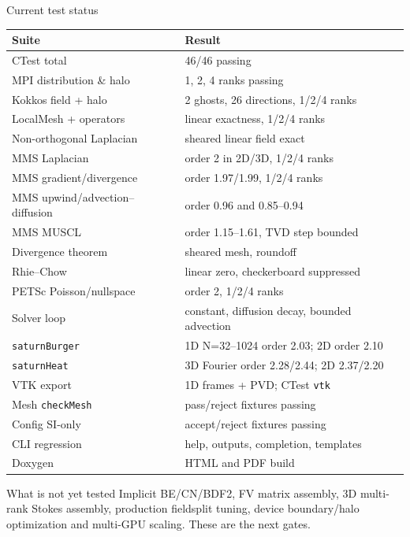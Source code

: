 \documentclass[aspectratio=169,10pt]{beamer}
\begin{document}
\begin{frame}{Current test status}
  \begin{center}
    \small
    \begin{tabular}{ll}
      \toprule
      Suite & Result \\
      \midrule
      CTest total & 46/46 passing \\
      MPI distribution \& halo & 1, 2, 4 ranks passing \\
      Kokkos field + halo & 2 ghosts, 26 directions, 1/2/4 ranks \\
      LocalMesh + operators & linear exactness, 1/2/4 ranks \\
      Non-orthogonal Laplacian & sheared linear field exact \\
      MMS Laplacian & order 2 in 2D/3D, 1/2/4 ranks \\
      MMS gradient/divergence & order 1.97/1.99, 1/2/4 ranks \\
      MMS upwind/advection--diffusion & order 0.96 and 0.85--0.94 \\
      MMS MUSCL & order 1.15--1.61, TVD step bounded \\
      Divergence theorem & sheared mesh, roundoff \\
      Rhie--Chow & linear zero, checkerboard suppressed \\
      PETSc Poisson/nullspace & order 2, 1/2/4 ranks \\
      Solver loop & constant, diffusion decay, bounded advection \\
      \texttt{saturnBurger} & 1D N=32--1024 order 2.03; 2D order 2.10 \\
      \texttt{saturnHeat} & 3D Fourier order 2.28/2.44; 2D 2.37/2.20 \\
      VTK export & 1D frames + PVD; CTest \texttt{vtk} \\
      Mesh \texttt{checkMesh} & pass/reject fixtures passing \\
      Config SI-only & accept/reject fixtures passing \\
      CLI regression & help, outputs, completion, templates \\
      Doxygen & HTML and PDF build \\
      \bottomrule
    \end{tabular}
  \end{center}

  \begin{block}{What is not yet tested}
    Implicit BE/CN/BDF2, FV matrix assembly, 3D multi-rank Stokes assembly,
    production fieldsplit tuning, device boundary/halo optimization and
    multi-GPU scaling. These are the next gates.
  \end{block}
\end{frame}
\end{document}
